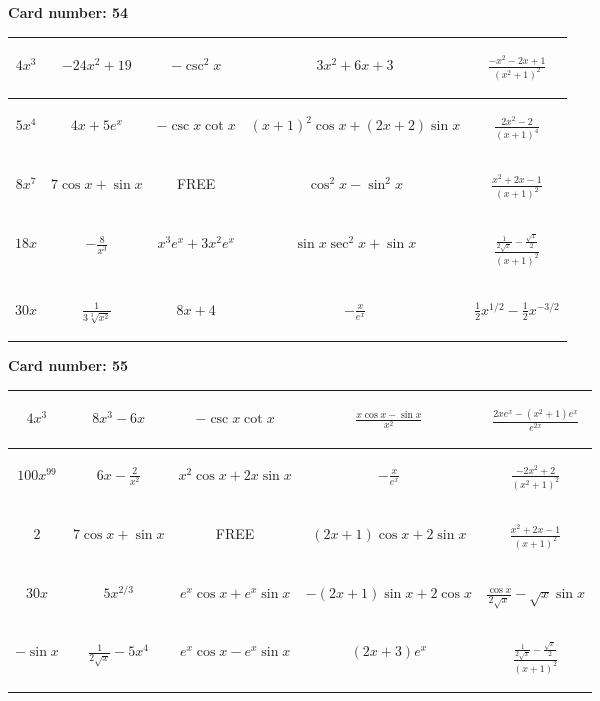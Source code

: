 \documentclass{article}
\newcommand{\entry}[1]{\begin{minipage}[t][2.75cm][t]{4cm} \vspace{1cm} \begin{center}#1\end{center} \end{minipage}}
\newcommand{\freespace}{\entry{FREE}}
\newcommand{\cardnumber}[1]{\noindent \textbf{Card number: #1} \bigskip}
\begin{document}
\pagebreak

\cardnumber{54}
\begin{center}
\begin{tabular}{|*{5}{c|}}
    \hline
    \entry{$4x^3$} & \entry{$-24x^2 + 19$} & \entry{$-\csc^2 x$} & \entry{$3x^2 + 6x + 3$} & \entry{$\frac{-x^2 - 2x + 1}{(x^2 + 1)^2}$} \\ \hline
    \entry{$5x^4$} & \entry{$4x + 5e^x$} & \entry{$-\csc x \cot x$} & \entry{$(x + 1)^2 \cos x + (2x + 2) \sin x$} & \entry{$\frac{2x^2 - 2}{(x + 1)^4}$} \\ \hline
    \entry{$8x^7$} & \entry{$7 \cos x + \sin x$} & \freespace & \entry{$\cos^2 x - \sin^2 x$} & \entry{$\frac{x^2 + 2x - 1}{(x + 1)^2}$} \\ \hline
    \entry{$18x$} & \entry{$-\frac{8}{x^3}$} & \entry{$x^3 e^x + 3x^2 e^x$} & \entry{$\sin x \sec^2 x + \sin x$} & \entry{$\frac{\frac{1}{2 \sqrt{x}} - \frac{\sqrt{x}}{2}}{(x + 1)^2}$} \\ \hline
    \entry{$30x$} & \entry{$\frac{1}{3\sqrt[3]{x^2}}$} & \entry{$8x + 4$} & \entry{$-\frac{x}{e^x}$} & \entry{$\frac{1}{2} x^{1/2} - \frac{1}{2} x^{-3/2}$} \\ \hline
\end{tabular}
\end{center}

\pagebreak

\cardnumber{55}
\begin{center}
\begin{tabular}{|*{5}{c|}}
    \hline
    \entry{$4x^3$} & \entry{$8x^3 - 6x$} & \entry{$-\csc x \cot x$} & \entry{$\frac{x \cos x - \sin x}{x^2}$} & \entry{$\frac{2x e^x - (x^2 + 1) e^x}{e^{2x}}$} \\ \hline
    \entry{$100x^{99}$} & \entry{$6x - \frac{2}{x^2}$} & \entry{$x^2 \cos x + 2x \sin x$} & \entry{$-\frac{x}{e^x}$} & \entry{$\frac{-2x^2 + 2}{(x^2 + 1)^2}$} \\ \hline
    \entry{$2$} & \entry{$7 \cos x + \sin x$} & \freespace & \entry{$(2x + 1) \cos x + 2 \sin x$} & \entry{$\frac{x^2 + 2x - 1}{(x + 1)^2}$} \\ \hline
    \entry{$30x$} & \entry{$5x^{2/3}$} & \entry{$e^x \cos x + e^x \sin x$} & \entry{$-(2x + 1) \sin x + 2 \cos x$} & \entry{$\frac{\cos x}{2 \sqrt{x}} - \sqrt{x} \sin x$} \\ \hline
    \entry{$-\sin x$} & \entry{$\frac{1}{2\sqrt{x}} - 5x^4$} & \entry{$e^x \cos x - e^x \sin x$} & \entry{$(2x + 3) e^x$} & \entry{$\frac{\frac{1}{2 \sqrt{x}} - \frac{\sqrt{x}}{2}}{(x + 1)^2}$} \\ \hline
\end{tabular}
\end{center}
\end{document}
